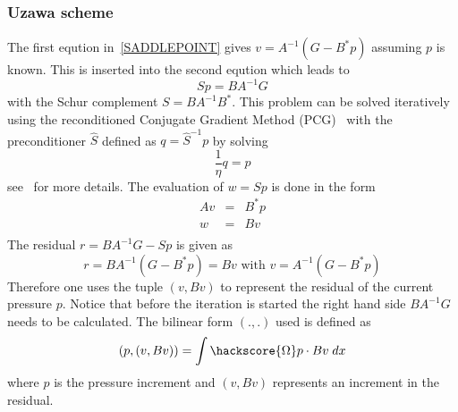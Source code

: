 \subsubsection{Uzawa scheme} 
The first eqution in~\ref{SADDLEPOINT} gives $v=A^{-1}(G-B^{*}p)$ assuming $p$ is known. This is inserted into the 
second eqution which leads to 
\begin{equation}
S p =  B A^{-1} G
\end{equation}
with the Schur complement  $S=BA^{-1}B^{*}$. This problem can be solved iteratively using the reconditioned Conjugate Gradient Method (PCG)~ 
with the preconditioner $\hat{S}$ defined as $q=\hat{S}^{-1}p$ by solving
\begin{equation}
\frac{1}{\eta}q = p 
\end{equation}
see~\cite{ELMAN} for more details. The evaluation of $w=Sp$ is done in the form
\begin{equation}
\begin{array}{rcl}
A v & = & B^{*}p \\
w & = & Bv \\
\end{array}
\label{EVAL PCG}
\end{equation}
The residual   $r=B A^{-1} G - S p$ is given as 
\begin{equation}
r=B A^{-1} (G - B^* p) = Bv \mbox{ with } v = A^{-1}(G-B^{*}p)
\end{equation}
Therefore one uses the tuple $(v,Bv)$ to represent the residual of the current pressure $p$. Notice that before the iteration is started the right hand side $B A^{-1} G$ needs to be calculated. The bilinear form $(.,.)$ used is defined as
\begin{equation}
(p,(v,Bv))=\int\hackscore{\Omega} p \cdot Bv \; dx 
\end{equation}
where $p$ is the pressure increment and $(v,Bv)$ represents an increment in the residual.

